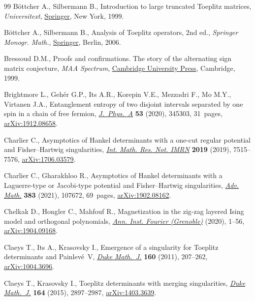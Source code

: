 \begin{thebibliography}{99}
B\"ottcher A., Silbermann B., Introduction to large truncated {T}oeplitz
 matrices, \textit{Universitext}, \href{https://doi.org/10.1007/978-1-4612-1426-7}{Springer}, New York, 1999.

B\"ottcher A., Silbermann B., Analysis of {T}oeplitz operators, 2nd ed.,
 \textit{Springer Monogr. Math.}, \href{https://doi.org/10.1007/3-540-32436-4}{Springer}, Berlin, 2006.

Bressoud D.M., Proofs and confirmations. The story of the alternating sign
 matrix conjecture, \textit{MAA Spectrum}, \href{https://doi.org/10.1017/CBO9780511613449}{Cambridge University Press}, Cambridge, 1999.

Brightmore L., Geh\'er G.P., Its A.R., Korepin V.E., Mezzadri F., Mo M.Y.,
 Virtanen J.A., Entanglement entropy of two disjoint intervals separated by
 one spin in a chain of free fermion, \href{https://doi.org/10.1088/1751-8121/ab9cf2}{\textit{J.~Phys.~A}} \textbf{53} (2020),
 345303, 31~pages, \href{https://arxiv.org/abs/1912.08658}{arXiv:1912.08658}.

Charlier C., Asymptotics of {H}ankel determinants with a one-cut regular
 potential and {F}isher--{H}artwig singularities, \href{https://doi.org/10.1093/imrn/rny009}{\textit{Int. Math. Res. Not.
 IMRN}} \textbf{2019} (2019), 7515--7576, \href{https://arxiv.org/abs/1706.03579}{arXiv:1706.03579}.

Charlier C., Gharakhloo R., Asymptotics of {H}ankel determinants with a
 {L}aguerre-type or {J}acobi-type potential and {F}isher--{H}artwig
 singularities, \href{https://doi.org/10.1016/j.aim.2021.107672}{\textit{Adv. Math.}} \textbf{383} (2021), 107672, 69~pages,
 \href{https://arxiv.org/abs/1902.08162}{arXiv:1902.08162}.

Chelkak D., Hongler C., Mahfouf R., Magnetization in the zig-zag layered
 {I}sing model and orthogonal polynomials, \href{https://doi.org/10.5802/aif.3605}{\textit{Ann. Inst. Fourier
 (Grenoble)}} (2020), 1--56, \href{https://arxiv.org/abs/1904.09168}{arXiv:1904.09168}.

Claeys T., Its A., Krasovsky I., Emergence of a singularity for {T}oeplitz
 determinants and {P}ainlev\'e~{V}, \href{https://doi.org/10.1215/00127094-1444207}{\textit{Duke Math.~J.}} \textbf{160}
 (2011), 207--262, \href{https://arxiv.org/abs/1004.3696}{arXiv:1004.3696}.

Claeys T., Krasovsky I., Toeplitz determinants with merging singularities,
 \href{https://doi.org/10.1215/00127094-3164897}{\textit{Duke Math.~J.}} \textbf{164} (2015), 2897--2987, \href{https://arxiv.org/abs/1403.3639}{arXiv:1403.3639}.


\end{thebibliography}
